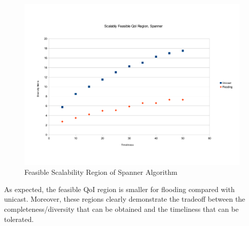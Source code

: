 \begin{figure}
    \includegraphics[scale=0.35]{figures/spanScalR.pdf}
    \caption{Feasible Scalability Region of Spanner Algorithm}
    \label{fig:spanScalR}
\end{figure}

As expected, the feasible QoI region is smaller for flooding compared with unicast. Moreover, these regions clearly demonstrate the tradeoff between the completeness/diversity that can be obtained and the timeliness that can be tolerated. 